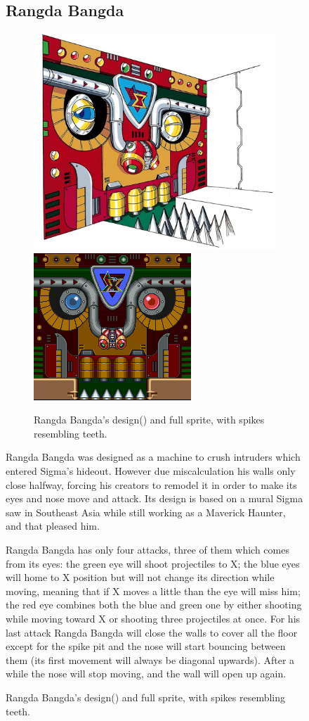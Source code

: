 \begin{figure}[htp]
\subsection{Rangda Bangda}\label{boss:Rangda_bangda}
\begin{figure}[htp]
	\centering
	\includegraphics[width=0.4\linewidth]{figures/X1/Sigma_stages/RangdaBangda.jpg}
	\includegraphics[width=0.35\linewidth]{figures/X1/Sigma_stages/Rangdabangdasprite.png}
	\caption{Rangda Bangda's design(\cite{book:MMX_Complete_art}) and full sprite, with spikes resembling teeth.}
\end{figure}
Rangda Bangda was designed as a machine to crush intruders which entered Sigma's hideout. However due miscalculation his walls only close halfway, forcing his creators to remodel it in order to make its eyes and nose move and attack. Its design is based on a mural Sigma saw in Southeast Asia while still working as a Maverick Haunter, and that pleased him\cite{wayback:X_resources}.

Rangda Bangda has only four attacks, three of them which comes from its eyes\cite{wiki:Rangda_bangda}: the green eye will shoot projectiles to X; the blue eyes will home to X position but will not change its direction while moving, meaning that if X moves a little than the eye will miss him; the red eye combines both the blue and green one by either shooting while moving toward X or shooting three projectiles at once. For his last attack Rangda Bangda will close the walls to cover all the floor except for the spike pit and the nose will start bouncing between them (its first movement will always be diagonal upwards\cite{stratwiki:Sigma_stage_2}). After a while the nose will stop moving, and the wall will open up again.


\end{figure}
